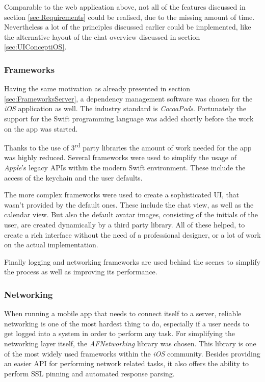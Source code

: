 Comparable to the web application above, not all of the features discussed in section \vref{sec:Requirements} could be realised, due to the missing amount of time. Nevertheless a lot of the principles discussed earlier could be implemented, like the alternative layout of the chat overview discussed in section \vref{sec:UIConceptiOS}.

\subsubsection{Frameworks}
Having the same motivation as already presented in section \vref{sec:FrameworksServer}, a dependency management software was chosen for the \emph{iOS} application as well. The industry standard is \emph{CocoaPods}. Fortunately the support for the \gls{Swift} programming language was added shortly before the work on the app was started. 

Thanks to the use of 3\textsuperscript{rd} party libraries the amount of work needed for the app was highly reduced. Several frameworks were used to simplify the usage of \emph{Apple}'s legacy \gls{API}s within the modern \gls{Swift} environment. These include the access of the keychain and the user defaults.

The more complex frameworks were used to create a sophisticated \gls{UI}, that wasn't provided by the default ones. These include the chat view, as well as the calendar view. But also the default avatar images, consisting of the initials of the user, are created dynamically by a third party library. All of these helped, to create a rich interface without the need of a professional designer, or a lot of work on the actual implementation. 

Finally logging and networking frameworks are used behind the scenes to simplify the process as well as improving its performance.

\subsubsection{Networking}

When running a mobile app that needs to connect itself to a server, reliable networking is one of the most hardest thing to do, especially if a user needs to get logged into a system in order to perform any task. For simplifying the networking layer itself, the \emph{AFNetworking} library was chosen. This library is one of the most widely used frameworks within the \emph{iOS} community. Besides providing an easier \gls{API} for performing network related tasks, it also offers the ability to perform SSL pinning and automated response parsing.

